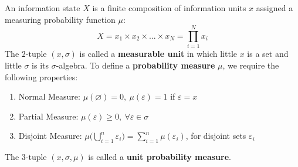 \documentclass[10pt, a5paper, twoside, openright]{memoir}
\begin{document}
An information state $X$ is a finite composition of information units $x$ assigned a measuring probability function $\mu$:
$$X = x_1 \times x_2 \times ... \times x_N = \prod\limits^{N}_{i=1} x_i$$
The $2$-tuple $(x, \sigma)$ is called a \textbf{measurable unit} in which little $x$ is a set and little $\sigma$ is its $\sigma$-algebra. To define a \textbf{probability measure} $\mu$, we require the following properties:
\begin{enumerate}
\item Normal Measure: $\mu(\varnothing) = 0, \ \mu(\varepsilon) = 1$ if $\varepsilon = x$
\item Partial Measure: $\mu (\varepsilon) \geq 0, \ \forall \varepsilon \in \sigma$
\item Disjoint Measure: $\mu \Big ( \bigcup\limits^{n}_{i=1} \varepsilon_i \Big )= \sum\limits^{n}_{i=1} \mu(\varepsilon_i)$, for disjoint sets $\varepsilon_i$
\end{enumerate}
The $3$-tuple $(x, \sigma, \mu)$ is called a \textbf{unit probability measure}.
\end{document}
